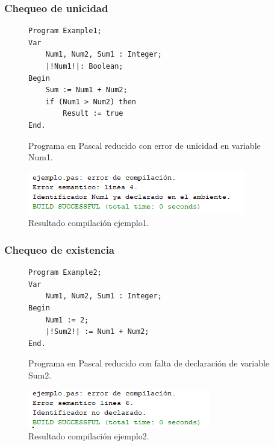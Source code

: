 \subsubsection{Chequeo de unicidad}
\begin{figure}[H]
\begin{verbatim}
Program Example1;
Var       
    Num1, Num2, Sum1 : Integer;
    |!Num1!|: Boolean;
Begin
    Sum := Num1 + Num2;
    if (Num1 > Num2) then
        Result := true
End.
\end{verbatim}
\caption{Programa en Pascal reducido con error de unicidad en variable Num1.}
\label{fig:semantico_ej_error_1}
\end{figure}

\begin{figure}[H]
\centering
\includegraphics[]{img/semantico/semantico_ej1.png}
\caption{Resultado compilación ejemplo1.}
\label{fig:semantico_ej1}
\end{figure}

\subsubsection{Chequeo de existencia}
\begin{figure}[H]
\begin{verbatim}
Program Example2;
Var       
    Num1, Num2, Sum1 : Integer;
Begin 
    Num1 := 2;
    |!Sum2!| := Num1 + Num2;
End.
\end{verbatim}
\caption{Programa en Pascal reducido con falta de declaración de variable Sum2.}
\label{fig:semantico_ej_error_2}
\end{figure}

\begin{figure}[H]
\centering
\includegraphics[]{img/semantico/semantico_ej2.png}
\caption{Resultado compilación ejemplo2.}
\label{fig:semantico_ej2}
\end{figure}

